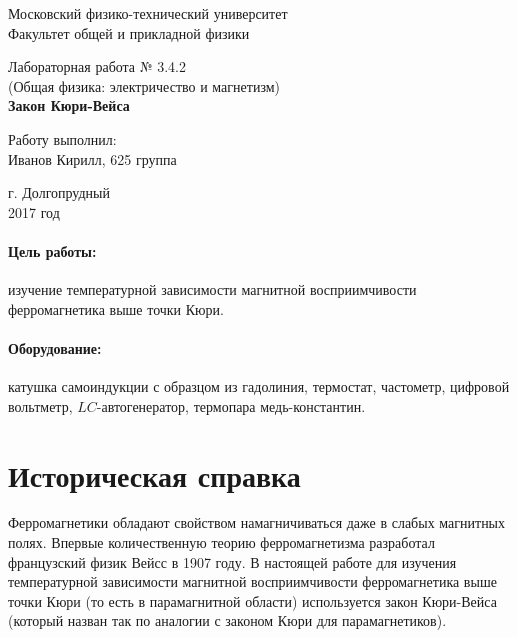 \documentclass[12pt]{kiarticle}
\begin{document}
\begin{titlepage}
	\begin{center}
		\large 	Московский физико-технический университет \\
		Факультет общей и прикладной физики \\
		\vspace{0.2cm}
		
		\vspace{4.5cm}
		Лабораторная работа № 3.4.2 \\ \vspace{0.2cm}
		\large (Общая физика: электричество и магнетизм) \\ \vspace{0.2cm}
		\LARGE \textbf{Закон Кюри-Вейса}
	\end{center}
	\vspace{2.3cm} \large
	
	\begin{center}
		Работу выполнил: \\
		Иванов Кирилл,
		625 группа
		

		
		
	\end{center}
	
	\begin{center} \vspace{50mm}
		г. Долгопрудный \\
		 2017 год
	\end{center}
\end{titlepage}

\paragraph*{Цель работы:} изучение температурной зависимости магнитной восприимчивости ферромагнетика выше точки Кюри.

\paragraph*{Оборудование:} катушка самоиндукции с образцом из гадолиния, термостат, частометр, цифровой вольтметр, $ LC $-автогенератор, термопара медь-константин.


\section{Историческая справка}

Ферромагнетики обладают свойством намагничиваться даже в слабых магнитных полях. Впервые количественную теорию ферромагнетизма разработал французский физик Вейсс в 1907 году. В настоящей работе для изучения температурной зависимости магнитной восприимчивости ферромагнетика выше точки Кюри (то есть в парамагнитной области) используется закон Кюри-Вейса (который назван так по аналогии с законом Кюри для парамагнетиков).
\end{document}
